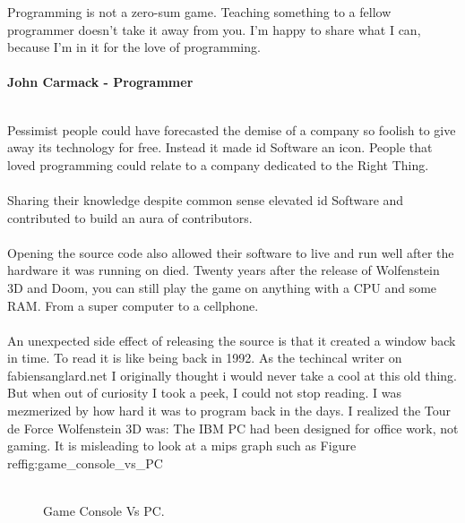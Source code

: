  \begin{fancyquotes}
   Programming is not a zero-sum game. Teaching something to a fellow programmer doesn't take it away from you. I'm happy to share what I can, because I'm in it for the love of programming.\\
   \\
\textbf{John Carmack - Programmer}
 \end{fancyquotes}
\\
Pessimist people could have forecasted the demise of a company so foolish to give away its technology for free. Instead it made id Software an icon. People that loved programming could relate to a company dedicated to the Right Thing.\\
\\
Sharing their knowledge despite common sense elevated id Software and contributed to build an aura of contributors.\\
\\
Opening the source code also allowed their software to live and run well after the hardware it was running on died. Twenty years after the release of Wolfenstein 3D and Doom, you can still play the game on anything with a CPU and some RAM. From a super computer to a cellphone.\\
\\
An unexpected side effect of releasing the source is that it created a window back in time. To read it is like being back in 1992. As the techincal writer on fabiensanglard.net I originally thought i would never take a cool at this old thing. But when out of curiosity I took a peek, I could not stop reading. I was mezmerized by how hard it was to program back in the days. I realized the Tour de Force Wolfenstein 3D was: The IBM PC had been designed for office work, not gaming. It is misleading to look at a mips graph such as Figure ref{fig:game_console_vs_PC}\\
\\
\begin{figure}[H]
\centering
   \caption{Game Console Vs PC.} \label{fig:game_console_vs_PC}
 \end{figure}
